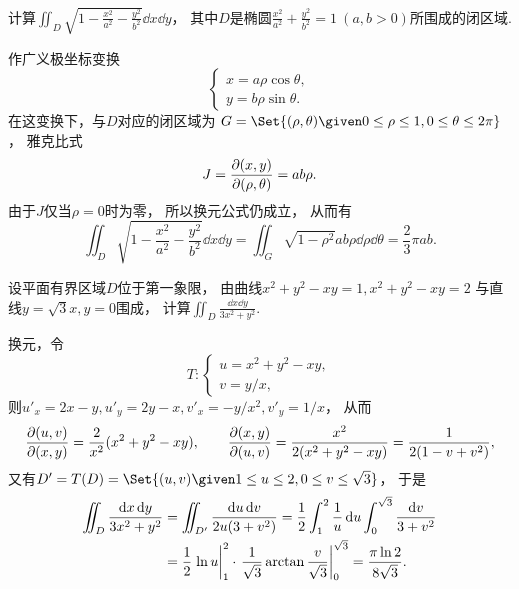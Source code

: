 \begin{example}
计算\(\iint_D \sqrt{1 - \frac{x^2}{a^2} - \frac{y^2}{b^2}} \dd{x} \dd{y}\)，
其中\(D\)是椭圆\(\frac{x^2}{a^2} + \frac{y^2}{b^2} = 1\ (a,b>0)\)所围成的闭区域.
\begin{solution}
作广义极坐标变换\[
	\left\{ \begin{array}{l}
		x = a \rho \cos\theta, \\
		y = b \rho \sin\theta.
	\end{array} \right.
\]
在这变换下，与\(D\)对应的闭区域为
\(G = \Set{(\rho,\theta) \given 0\leq\rho\leq1,0\leq\theta\leq2\pi}\)，
雅克比式\[
	J = \pdv{ (x,y) }{ (\rho,\theta) } = ab\rho.
\]
由于\(J\)仅当\(\rho=0\)时为零，
所以换元公式仍成立，
从而有\[
	\iint_D \sqrt{1 - \frac{x^2}{a^2} - \frac{y^2}{b^2}} \dd{x} \dd{y}
	= \iint_G \sqrt{1-\rho^2} ab\rho \dd{\rho} \dd{\theta}
	= \frac23 \pi ab.
\]
\end{solution}
\end{example}

\begin{example}
设平面有界区域\(D\)位于第一象限，
由曲线\(x^2+y^2-xy=1,
x^2+y^2-xy=2\)
与直线\(y=\sqrt3 x,
y=0\)围成，
计算\(\iint_D \frac{\dd{x}\dd{y}}{3x^2+y^2}\).
\begin{solution}
换元，令\begin{equation*}
	T: \left\{ \begin{array}{l}
		u=x^2+y^2-xy, \\
		v=y/x,
	\end{array} \right.
\end{equation*}
则\(u'_x=2x-y,
u'_y=2y-x,
v'_x=-y/x^2,
v'_y=1/x\)，
从而\begin{equation*}
	\pdv{ (u,v) }{ (x,y) } = \frac2{x^2} (x^2+y^2-xy),
	\qquad
	\pdv{ (x,y) }{ (u,v) } = \frac{x^2}{2(x^2+y^2-xy)}
	= \frac1{2(1-v+v^2)},
\end{equation*}
又有\(D' = T(D)
= \Set{ (u,v) \given 1 \leq u \leq 2, 0 \leq v \leq \sqrt3 }\)，
于是\begin{align*}
	\iint_D \frac{\dd{x}\dd{y}}{3x^2+y^2}
	&= \iint_{D'} \frac{\dd{u}\dd{v}}{2u(3+v^2)}
	= \frac12 \int_1^2 \frac1u \dd{u} \int_0^{\sqrt3} \frac{\dd{v}}{3+v^2} \\
	&= \frac12 \eval{\ln u}_1^2 \cdot \eval{\frac1{\sqrt3} \arctan\frac{v}{\sqrt3}}_0^{\sqrt3}
	= \frac{\pi \ln2}{8\sqrt3}.
\end{align*}
\end{solution}
\end{example}

